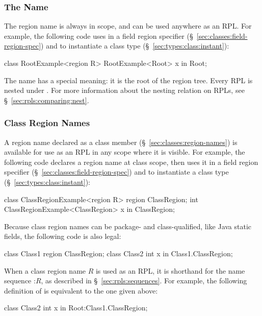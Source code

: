 \subsubsection{The Name %
\label{sec:rpls:basic:root}}

The region name  is always in scope, and can be used
anywhere as an RPL.  For example, the following code uses 
in a field region specifier (\S~\ref{sec:classes:field-region-spec})
and to instantiate a class type (\S~\ref{sec:types:class:instant}):
%
\begin{dpjlisting}
class RootExample<region R> {
    RootExample<Root> x in Root;
}
\end{dpjlisting}
%

The name  has a special meaning: it is the root of the
region tree.  Every RPL is nested under .  For more
information about the nesting relation on RPLs, see
\S~\ref{sec:rpls:comparing:nest}.

\subsubsection{Class Region Names%
\label{sec:rpls:basic:class}}

A region name declared as a class member
(\S~\ref{sec:classes:region-names}) is available for use as an RPL in
any scope where it is visible.  For example, the following code
declares a region name  at class scope, then uses it
in a field region specifier (\S~\ref{sec:classes:field-region-spec})
and to instantiate a class type (\S~\ref{sec:types:class:instant}):
%
\begin{dpjlisting}
class ClassRegionExample<region R> {
    region ClassRegion;
    int ClassRegionExample<ClassRegion> x in ClassRegion;
}
\end{dpjlisting}
%
Because class region names can be package- and class-qualified, like
Java static fields, the following code is also legal:
%
\begin{dpjlisting}
class Class1 {
    region ClassRegion;
}
class Class2 {
    int x in Class1.ClassRegion;
}
\end{dpjlisting}

When a class region name $R$ is used as an RPL, it is shorthand for
the name sequence :$R$, as described in
\S~\ref{sec:rpls:sequences}.  For example, the following definition of
 is equivalent to the one given above:
%
\begin{dpjlisting}
class Class2 {
    int x in Root:Class1.ClassRegion;
}
\end{dpjlisting}


